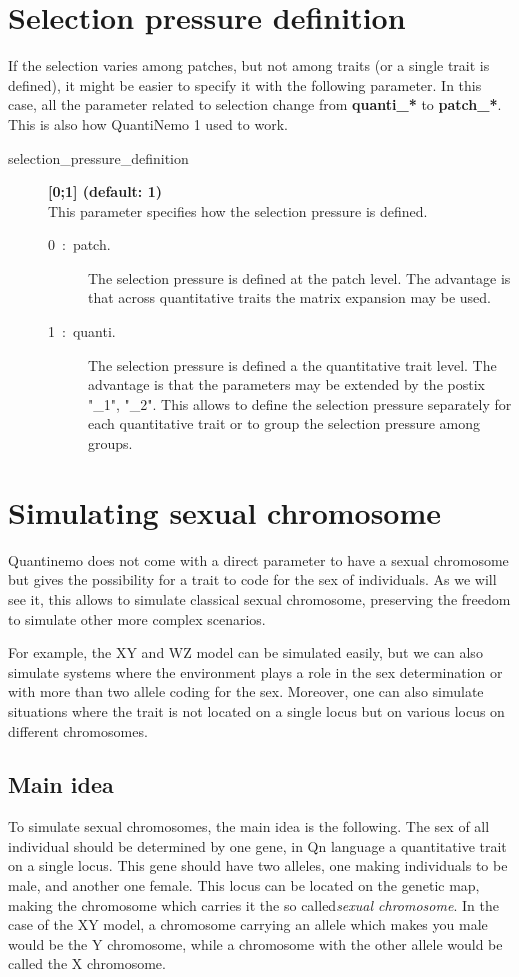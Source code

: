 \documentclass[letterpaper,12pt,oneside]{book}
\begin{document}
\begin{appendices}
\section{Selection pressure definition}\label{chap:SelectionPressureDefinition}
If the selection varies among patches, but not among traits (or a single trait is defined), it might be easier to specify it with the following parameter. In this case, all the parameter related to selection change from \textbf{quanti\_*} to \textbf{patch\_*}. This is also how QuantiNemo 1 used to work. 
\begin{description}
\item[selection\_pressure\_definition\index{}]\textbf{[0;1] (default: 1)}\\
This parameter specifies how the selection pressure is defined. 
\begin{description}
\item[0~:~patch.] The selection pressure is defined at the patch level. The advantage is that across quantitative traits the matrix expansion may be used.
\item[1~:~quanti.] The selection pressure is defined a the quantitative trait level. The advantage is that the parameters may be extended by the postix "\_1", "\_2". This allows to define the selection pressure separately for each quantitative trait or to group the selection pressure among groups.
\end{description}
\end{description}

\section{Simulating sexual chromosome}
Quantinemo does not come with a direct parameter to have a sexual chromosome but gives the possibility for a trait to code for the sex of individuals. As we will see it, this allows to simulate classical sexual chromosome, preserving the freedom to simulate other more complex scenarios. 

For example, the XY and WZ model can be simulated easily, but we can also simulate systems where the environment plays a role in the sex determination or with more than two allele coding for the sex. Moreover, one can also simulate situations where the trait is not located on a single locus but on various locus on different chromosomes. 

\subsection{Main idea}
To simulate sexual chromosomes, the main idea is the following. The sex of all individual should be determined by one gene, in Qn language a quantitative trait on a single locus. This gene should have two alleles, one making individuals to be male, and another one female. This locus can be located on the genetic map, making the chromosome which carries it the so called\textit{sexual chromosome}. In the case of the XY model, a chromosome carrying an allele which makes you male would be the Y chromosome, while a chromosome with the other allele would be called the X chromosome. 


\end{appendices}
\end{document}
